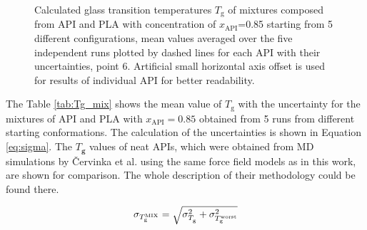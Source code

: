 \begin{figure}[htb!]
	\centering
	\vspace{-0.2cm}
	\caption{Calculated glass transition temperatures $T_\text{g}$ of mixtures composed from API and PLA with concentration of $x_\text{API}$=0.85 starting from 5 different configurations, mean values averaged over the five independent runs plotted by dashed lines for each API with their uncertainties, point 6. Artificial small horizontal axis offset is used for results of individual API for better readability.}
	\label{fig:results_tg}    
	\vspace{-0.2cm}
\end{figure}  


The Table \ref{tab:Tg_mix} shows the mean value of $T_\text{g}$ with the uncertainty for the mixtures of API and PLA with $x_\text{API}=0.85$ obtained from 5 runs from different starting conformations. The calculation of the uncertainties is shown in Equation \ref{eq:sigma}. The $T_\textbf{g}$ values of neat APIs, which were obtained from MD simulations by Červinka et al. \cite{cervinka_structure_2021} using the same force field models as in this work, are shown for comparison. The whole description of their methodology could be found there. \vspace{-0.6cm}

\begin{equation}\label{eq:sigma}
	\vspace{-0.2cm}
	\sigma_{T_{\text{g}}^\text{MIX}} = \sqrt{\sigma_{T_{\text{g}}^\text{}}^2 + \sigma_{T_{\text{g}}^\text{worst}}^2}
	\vspace{-0.3cm}
\end{equation}

